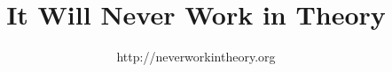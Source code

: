 \documentclass[10pt]{article}
\title{It Will Never Work in Theory}
\author{http://neverworkintheory.org}
\begin{document}
\maketitle
\nocite{*}


\end{document}
